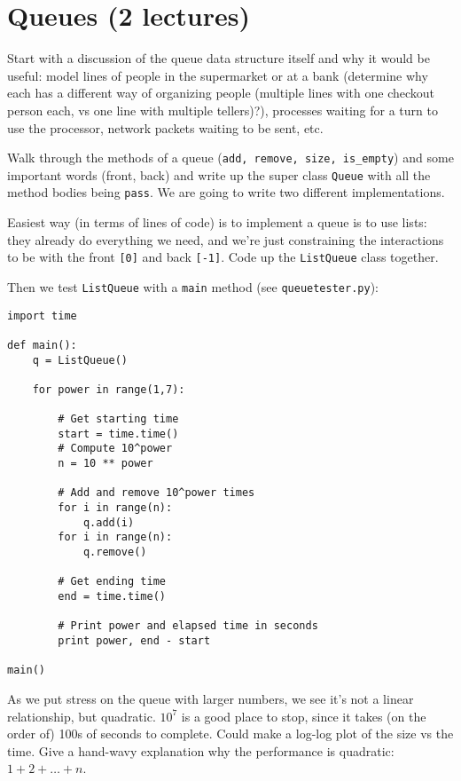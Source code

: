 \documentclass{article}
\begin{document}
\newpage
\section{Queues (2 lectures)}

Start with a discussion of the queue data structure itself and why it
would be useful: model lines of people in the supermarket or at a bank
(determine why each has a different way of organizing people (multiple
lines with one checkout person each, vs one line with multiple
tellers)?), processes waiting for a turn to use the processor, network
packets waiting to be sent, etc.

Walk through the methods of a queue
(\verb|add, remove, size, is_empty|) and some important words (front,
back) and write up the super class \verb|Queue| with all the method bodies
being \verb|pass|.  We are going to write two different implementations.

Easiest way (in terms of lines of code) is to implement a queue is to
use lists: they already do everything we need, and we're just
constraining the interactions to be with the front \verb|[0]| and back
\verb|[-1]|. Code up the \verb|ListQueue| class together.

Then we test \verb|ListQueue| with a \verb|main| method (see
\verb|queuetester.py|):

\begin{verbatim}
import time

def main():
    q = ListQueue()

    for power in range(1,7):

        # Get starting time
        start = time.time()
        # Compute 10^power
        n = 10 ** power

        # Add and remove 10^power times
        for i in range(n):
            q.add(i)
        for i in range(n):
            q.remove()

        # Get ending time
        end = time.time()

        # Print power and elapsed time in seconds
        print power, end - start

main()
\end{verbatim}

As we put stress on the queue with larger numbers, we see it's not a
linear relationship, but quadratic. $10^7$ is a good place to stop,
since it takes (on the order of) 100s of seconds to complete.  Could
make a log-log plot of the size vs the time.  Give a hand-wavy
explanation why the performance is quadratic: $1 + 2 + \dots + n$.
\end{document}
